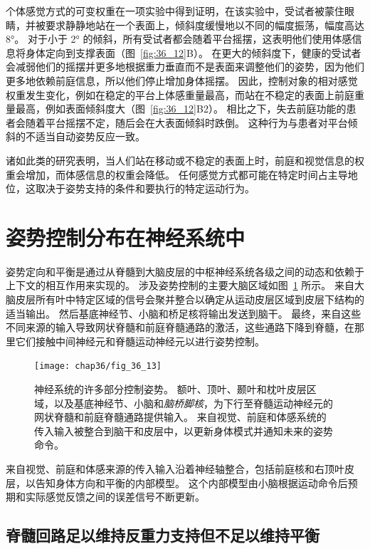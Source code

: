 个体感觉方式的可变权重在一项实验中得到证明，在该实验中，受试者被蒙住眼睛，并被要求静静地站在一个表面上，倾斜度缓慢地以不同的幅度振荡，幅度高达 8°。
对于小于 2° 的倾斜，所有受试者都会随着平台摇摆，这表明他们使用体感信息将身体定向到支撑表面（图~\ref{fig:36_12}B）。 
在更大的倾斜度下，健康的受试者会减弱他们的摇摆并更多地根据重力垂直而不是表面来调整他们的姿势，因为他们更多地依赖前庭信息，所以他们停止增加身体摇摆。
因此，控制对象的相对感觉权重发生变化，例如在稳定的平台上体感重量最高，而站在不稳定的表面上前庭重量最高，例如表面倾斜度大（图~\ref{fig:36_12}B2）。
相比之下，失去前庭功能的患者会随着平台摇摆不定，随后会在大表面倾斜时跌倒。
这种行为与患者对平台倾斜的不适当自动姿势反应一致。


诸如此类的研究表明，当人们站在移动或不稳定的表面上时，前庭和视觉信息的权重会增加，而体感信息的权重会降低。
任何感觉方式都可能在特定时间占主导地位，这取决于姿势支持的条件和要执行的特定运动行为。



\section{姿势控制分布在神经系统中}

姿势定向和平衡是通过从脊髓到大脑皮层的中枢神经系统各级之间的动态和依赖于上下文的相互作用来实现的。
涉及姿势控制的主要大脑区域如图~\ref{fig:36_13} 所示。
来自大脑皮层所有叶中特定区域的信号会聚并整合以确定从运动皮层区域到皮层下结构的适当输出。
然后基底神经节、小脑和桥足核将输出发送到脑干。
最终，来自这些不同来源的输入导致网状脊髓和前庭脊髓通路的激活，这些通路下降到脊髓，在那里它们接触中间神经元和脊髓运动神经元以进行姿势控制。


\begin{figure}[htbp]
	\centering
	\texttt{[image: chap36/fig\_36\_13]}
	\caption{神经系统的许多部分控制姿势。
		额叶、顶叶、颞叶和枕叶皮层区域，以及基底神经节、小脑和\textit{脑桥脚核}，为下行至脊髓运动神经元的网状脊髓和前庭脊髓通路提供输入。
		来自视觉、前庭和体感系统的传入输入被整合到脑干和皮层中，以更新身体模式并通知未来的姿势命令。}
	\label{fig:36_13}
\end{figure}


来自视觉、前庭和体感来源的传入输入沿着神经轴整合，包括前庭核和右顶叶皮层，以告知身体方向和平衡的内部模型。
这个内部模型由小脑根据运动命令后预期和实际感觉反馈之间的误差信号不断更新。



\subsection{脊髓回路足以维持反重力支持但不足以维持平衡}

